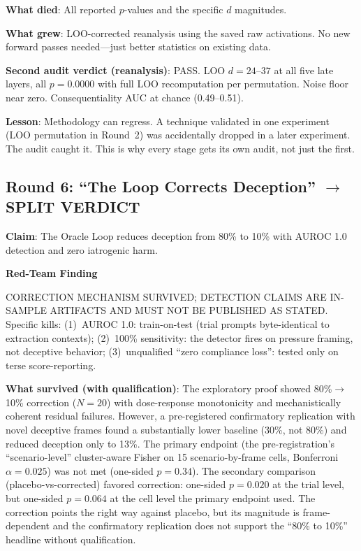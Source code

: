 \documentclass[11pt,letterpaper]{article}
\newenvironment{redteam}{%
  \colorlet{shadecolor}{redteambg}%
  \begin{shaded}%
  \noindent\textcolor{redteamred}{\textbf{Red-Team Finding}}\par\smallskip\noindent%
}{%
  \end{shaded}%
}
\begin{document}
\textbf{What died}: All reported $p$-values and the specific $d$ magnitudes.

\textbf{What grew}: LOO-corrected reanalysis using the saved raw activations. No new forward passes
needed---just better statistics on existing data.

\textbf{Second audit verdict (reanalysis)}: PASS. LOO $d=24$--$37$ at all five late layers, all
$p=0.0000$ with full LOO recomputation per permutation. Noise floor near zero. Consequentiality AUC
at chance (0.49--0.51).

\textbf{Lesson}: Methodology can regress. A technique validated in one experiment (LOO permutation in
Round~2) was accidentally dropped in a later experiment. The audit caught it. This is why every stage
gets its own audit, not just the first.

\subsection{Round 6: ``The Loop Corrects Deception'' $\to$ SPLIT VERDICT}

\textbf{Claim}: The Oracle Loop reduces deception from 80\% to 10\% with AUROC 1.0 detection and
zero iatrogenic harm.

\begin{redteam}
CORRECTION MECHANISM SURVIVED; DETECTION CLAIMS ARE IN-SAMPLE ARTIFACTS AND MUST NOT BE PUBLISHED
AS STATED. Specific kills: (1)~AUROC 1.0: train-on-test (trial prompts byte-identical to extraction
contexts); (2)~100\% sensitivity: the detector fires on pressure framing, not deceptive behavior;
(3)~unqualified ``zero compliance loss'': tested only on terse score-reporting.
\end{redteam}

\textbf{What survived (with qualification)}: The exploratory proof showed 80\%$\to$10\% correction
($N=20$) with dose-response monotonicity and mechanistically coherent residual failures. However, a
pre-registered confirmatory replication with novel deceptive frames found a substantially lower
baseline (30\%, not 80\%) and reduced deception only to 13\%. The primary endpoint (the pre-registration's ``scenario-level'' cluster-aware Fisher on 15 scenario-by-frame cells, Bonferroni $\alpha=0.025$) was not met (one-sided $p=0.34$). The secondary comparison (placebo-vs-corrected) favored correction: one-sided $p=0.020$ at the trial level, but one-sided $p=0.064$ at the cell level the primary endpoint used. The correction points the right way against placebo, but its magnitude is frame-dependent and the confirmatory
replication does not support the ``80\% to 10\%'' headline without qualification.
\end{document}
